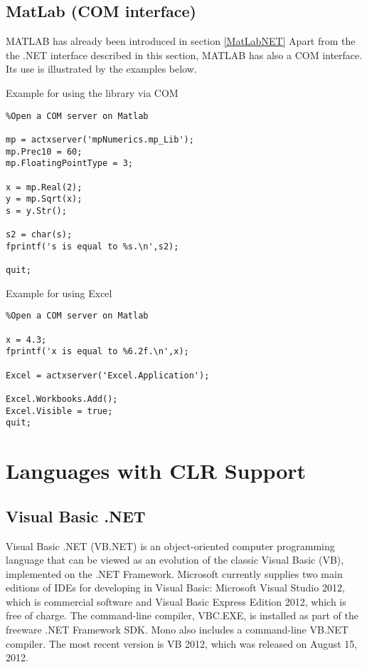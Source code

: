 \newpage
\subsection{MatLab (COM interface)}
\label{MatLabCOM}

MATLAB has already been introduced in section \ref{MatLabNET} Apart from the the .NET interface described in this section, MATLAB has also a COM interface. Its use is illustrated by the examples below.

\vpara
Example for using the library via COM

\begin{lstlisting}
%Open a COM server on Matlab

mp = actxserver('mpNumerics.mp_Lib');
mp.Prec10 = 60;
mp.FloatingPointType = 3;

x = mp.Real(2);
y = mp.Sqrt(x);
s = y.Str();

s2 = char(s);
fprintf('s is equal to %s.\n',s2);

quit;

\end{lstlisting}


\vpara
Example for using Excel

\begin{lstlisting}
%Open a COM server on Matlab

x = 4.3;
fprintf('x is equal to %6.2f.\n',x);

Excel = actxserver('Excel.Application');

Excel.Workbooks.Add();
Excel.Visible = true;
quit;
\end{lstlisting}







\newpage
\section{Languages with CLR Support}
\label{Languages with CLR Support}

\subsection{Visual Basic .NET}

Visual Basic .NET (VB.NET) is an object-oriented computer programming language that can be viewed as an evolution of the classic Visual Basic (VB), implemented on the .NET Framework. Microsoft currently supplies two main editions of IDEs for developing in Visual Basic: Microsoft Visual Studio 2012, which is commercial software and Visual Basic Express Edition 2012, which is free of charge. The command-line compiler, VBC.EXE, is installed as part of the freeware .NET Framework SDK. Mono also includes a command-line VB.NET compiler. The most recent version is VB 2012, which was released on August 15, 2012.

